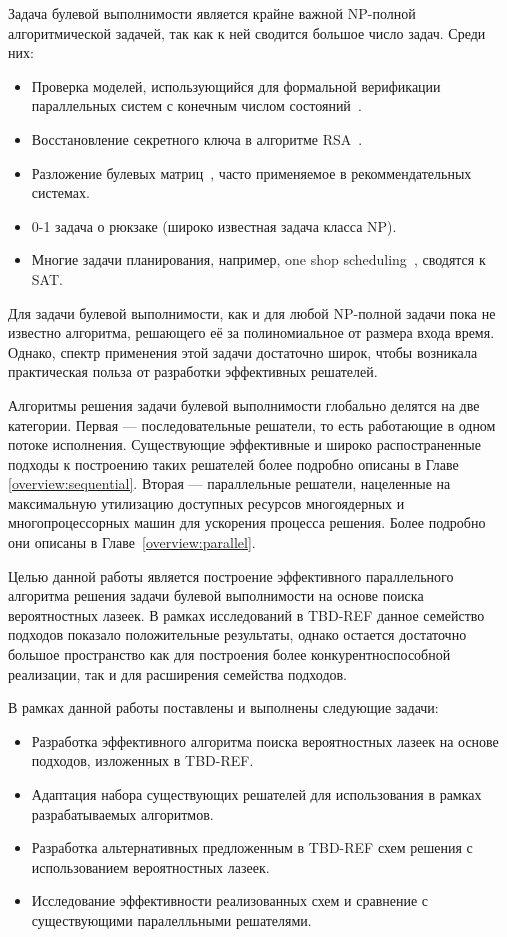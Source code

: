 \label{introduction}
\startprefacepage

Задача булевой выполнимости является крайне важной NP-полной~\cite{bib:cook-levin} алгоритмической
задачей, так как к ней сводится большое число задач. Среди них:
\begin{itemize}
    \item Проверка моделей, использующийся для формальной верификации параллельных систем с
        конечным числом состояний~\cite{bib:use-mc}.
    \item Восстановление секретного ключа в алгоритме RSA~\cite{bib:use-rsa}.
    \item Разложение булевых матриц~\cite{bib:use-bma}, часто применяемое в рекоммендательных
        системах.
    \item 0-1 задача о рюкзаке (широко известная задача класса NP).
    \item Многие задачи планирования, например, one shop scheduling~\cite{bib:use-ojs}, сводятся к SAT.
\end{itemize}

Для задачи булевой выполнимости, как и для любой NP-полной задачи пока не известно алгоритма,
решающего её за полиномиальное от размера входа время. Однако, спектр применения этой задачи
достаточно широк, чтобы возникала практическая польза от разработки эффективных решателей.

Алгоритмы решения задачи булевой выполнимости глобально делятся на две категории. Первая --- 
последовательные решатели, то есть работающие в одном потоке исполнения. Существующие эффективные
и широко распостраненные подходы к построению таких решателей более подробно описаны в Главе~
\ref{overview:sequential}. Вторая --- параллельные решатели, нацеленные на максимальную утилизацию доступных
ресурсов многоядерных и многопроцессорных машин для ускорения процесса решения. Более подробно
они описаны в Главе~\ref{overview:parallel}.

Целью данной работы является построение эффективного параллельного алгоритма решения задачи булевой
выполнимости на основе поиска вероятностных лазеек. В рамках исследований в TBD-REF данное семейство
подходов показало положительные результаты, однако остается достаточно большое пространство как для
построения более конкурентноспособной реализации, так и для расширения семейства подходов.

В рамках данной работы поставлены и выполнены следующие задачи:
\begin{itemize}
    \item Разработка эффективного алгоритма поиска вероятностных лазеек на основе подходов,
        изложенных в TBD-REF.
    \item Адаптация набора существующих решателей для использования в рамках разрабатываемых
        алгоритмов.
    \item Разработка альтернативных предложенным в TBD-REF схем решения с использованием
        вероятностных лазеек.
    \item Исследование эффективности реализованных схем и сравнение с существующими
        паралелльными решателями.
\end{itemize}

